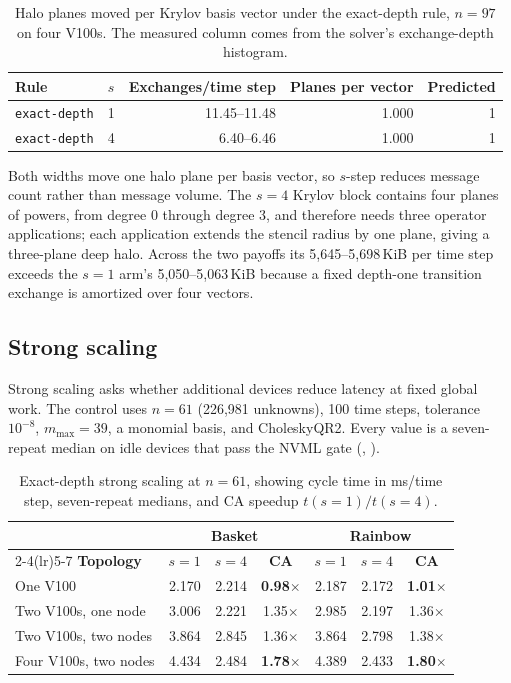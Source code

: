 \begin{table}[htbp!]
\centering
\caption{Halo planes moved per Krylov basis vector under the exact-depth rule, $n=97$ on four V100s. The measured column comes from the solver's exchange-depth histogram.}
\label{tab:ca-depth}
\begin{tabular}{@{}llrrr@{}}
\toprule
\textbf{Rule} & $s$ & \textbf{Exchanges/time step} & \textbf{Planes per vector} & \textbf{Predicted} \\
\midrule
\texttt{exact-depth} & 1 & 11.45--11.48 & 1.000 & 1 \\
\texttt{exact-depth} & 4 & 6.40--6.46  & 1.000 & 1 \\
\bottomrule
\end{tabular}
\end{table}


Both widths move one halo plane per basis vector, so $s$-step reduces message count rather than message volume. The $s=4$ Krylov block contains four planes of powers, from degree 0 through degree 3, and therefore needs three operator applications; each application extends the stencil radius by one plane, giving a three-plane deep halo. Across the two payoffs its 5{,}645--5{,}698\,KiB per time step exceeds the $s=1$ arm's 5{,}050--5{,}063\,KiB because a fixed depth-one transition exchange is amortized over four vectors.

\subsection{Strong scaling}\label{sec:integrator-strong}

Strong scaling asks whether additional devices reduce latency at fixed global work. The control uses $n=61$ (226{,}981 unknowns), 100 time steps, tolerance $10^{-8}$, $m_{\max}=39$, a monomial basis, and CholeskyQR2. Every value is a seven-repeat median on idle devices that pass the NVML gate (, ).

\begin{table}[htbp!]
\centering
\caption{Exact-depth strong scaling at $n=61$, showing cycle time in ms/time step, seven-repeat medians, and CA speedup $t(s{=}1)/t(s{=}4)$.}
\label{tab:ca-strong}
\begin{tabular}{@{}lrrcrrc@{}}
\toprule
& \multicolumn{3}{c}{\textbf{Basket}} & \multicolumn{3}{c}{\textbf{Rainbow}} \\
\cmidrule(lr){2-4}\cmidrule(lr){5-7}
\textbf{Topology} & $s{=}1$ & $s{=}4$ & \textbf{CA} & $s{=}1$ & $s{=}4$ & \textbf{CA} \\
\midrule
One V100                & 2.170 & 2.214 & \textbf{0.98$\times$} & 2.187 & 2.172 & \textbf{1.01$\times$} \\
Two V100s, one node     & 3.006 & 2.221 & 1.35$\times$ & 2.985 & 2.197 & 1.36$\times$ \\
Two V100s, two nodes    & 3.864 & 2.845 & 1.36$\times$ & 3.864 & 2.798 & 1.38$\times$ \\
Four V100s, two nodes   & 4.434 & 2.484 & \textbf{1.78$\times$} & 4.389 & 2.433 & \textbf{1.80$\times$} \\
\bottomrule
\end{tabular}
\end{table}

